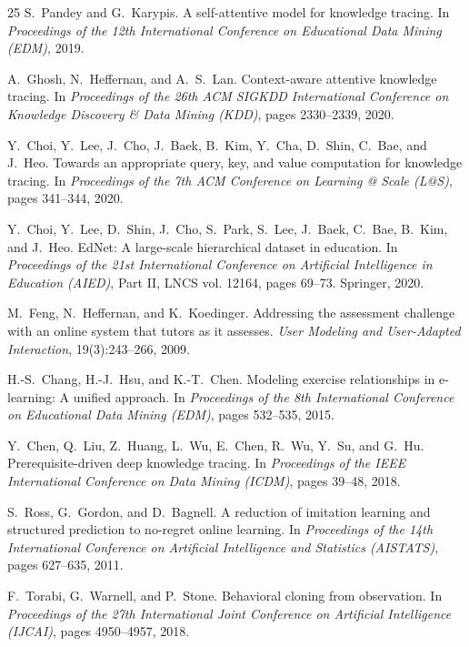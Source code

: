 \documentclass[sigconf,anonymous]{acmart}
\begin{document}
\begin{thebibliography}{25}
S.~Pandey and G.~Karypis.
\newblock A self-attentive model for knowledge tracing.
\newblock In \emph{Proceedings of the 12th International Conference on Educational Data Mining (EDM)}, 2019.

A.~Ghosh, N.~Heffernan, and A.~S.~Lan.
\newblock Context-aware attentive knowledge tracing.
\newblock In \emph{Proceedings of the 26th ACM SIGKDD International Conference on Knowledge Discovery \& Data Mining (KDD)}, pages 2330--2339, 2020.

Y.~Choi, Y.~Lee, J.~Cho, J.~Baek, B.~Kim, Y.~Cha, D.~Shin, C.~Bae, and J.~Heo.
\newblock Towards an appropriate query, key, and value computation for knowledge tracing.
\newblock In \emph{Proceedings of the 7th ACM Conference on Learning @ Scale (L@S)}, pages 341--344, 2020.

Y.~Choi, Y.~Lee, D.~Shin, J.~Cho, S.~Park, S.~Lee, J.~Baek, C.~Bae, B.~Kim, and J.~Heo.
\newblock EdNet: A large-scale hierarchical dataset in education.
\newblock In \emph{Proceedings of the 21st International Conference on Artificial Intelligence in Education (AIED)}, Part II, LNCS vol. 12164, pages 69--73. Springer, 2020.

M.~Feng, N.~Heffernan, and K.~Koedinger.
\newblock Addressing the assessment challenge with an online system that tutors as it assesses.
\newblock \emph{User Modeling and User-Adapted Interaction}, 19(3):243--266, 2009.

H.-S.~Chang, H.-J.~Hsu, and K.-T.~Chen.
\newblock Modeling exercise relationships in e-learning: A unified approach.
\newblock In \emph{Proceedings of the 8th International Conference on Educational Data Mining (EDM)}, pages 532--535, 2015.

Y.~Chen, Q.~Liu, Z.~Huang, L.~Wu, E.~Chen, R.~Wu, Y.~Su, and G.~Hu.
\newblock Prerequisite-driven deep knowledge tracing.
\newblock In \emph{Proceedings of the IEEE International Conference on Data Mining (ICDM)}, pages 39--48, 2018.

S.~Ross, G.~Gordon, and D.~Bagnell.
\newblock A reduction of imitation learning and structured prediction to no-regret online learning.
\newblock In \emph{Proceedings of the 14th International Conference on Artificial Intelligence and Statistics (AISTATS)}, pages 627--635, 2011.

F.~Torabi, G.~Warnell, and P.~Stone.
\newblock Behavioral cloning from observation.
\newblock In \emph{Proceedings of the 27th International Joint Conference on Artificial Intelligence (IJCAI)}, pages 4950--4957, 2018.


\end{thebibliography}
\end{document}
